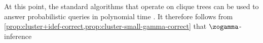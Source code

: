 At this point, the standard algorithms that operate on
clique trees
can be used to answer probabilistic queries in polynomial time \parencite[\S 10.3.3]{koller2009probabilistic}.
%
%
%
It therefore
follows from \cref{prop:cluster+idef-correct,prop:cluster-small-gamma-correct}
that
$\zogamma$-inference
